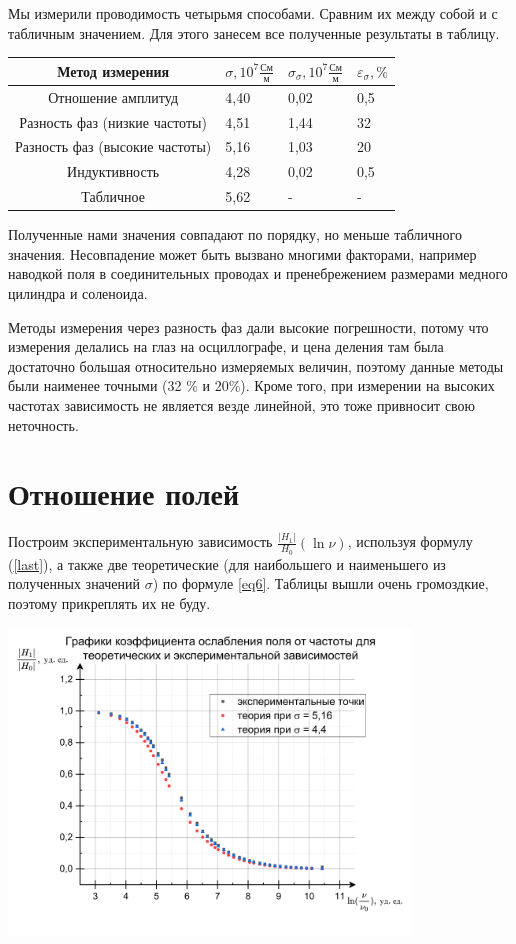 \documentclass[a4paper,12pt]{article}
\theoremstyle{plain} %
\theoremstyle{definition} %
\theoremstyle{remark} %
\renewcommand{\epsilon}{\varepsilon}
\begin{document}
		Мы измерили проводимость четырьмя способами. Сравним их между собой и с табличным значением. Для этого занесем все полученные результаты в таблицу.
													\begin{table}[h]
																\begin{center}
			\begin{tabularx}{0.7\textwidth}{|c|Y|Y|Y|}
				\hline
			Метод измерения & $\sigma,  10^7  \frac{\text{См}}{\text{м}}$ & $\sigma_{\sigma}, 10^7  \frac{\text{См}}{\text{м}}$ & $\epsilon_{\sigma}, \%$ \\ \hline
			Отношение амплитуд& 4,40 & 0,02 & 0,5 \\ \hline
			Разность фаз (низкие частоты)& 4,51 & 1,44 & 32 \\ \hline
			Разность фаз (высокие частоты)& 5,16 & 1,03 & 20 \\ \hline
			Индуктивность&4,28 & 0,02 & 0,5 \\ \hline
			Табличное&5,62 & - & - \\ \hline
			\end{tabularx}
							\end{center}
			\label{tab:my-table6}
		\end{table}	
		
		Полученные нами значения совпадают по порядку, но меньше табличного значения. Несовпадение может быть вызвано многими факторами, например наводкой поля в соединительных проводах и пренебрежением размерами медного цилиндра и соленоида. 
		
		Методы измерения через разность фаз дали высокие погрешности, потому что измерения делались на глаз на осциллографе, и цена деления там была достаточно большая относительно измеряемых величин, поэтому данные методы были наименее точными (32 \% и 20\%). Кроме того, при измерении на высоких частотах зависимость не является везде линейной, это тоже привносит свою неточность.
		
\section{Отношение полей }		
Построим экспериментальную зависимость $\frac{|H_1|}{H_0} (\ln{\nu})$, используя формулу (\ref{last}), а также две теоретические (для наибольшего и наименьшего из полученных значений $\sigma$) по формуле \eqref{eq6}. Таблицы вышли очень громоздкие, поэтому прикреплять их не буду.

						\includegraphics[width = 0.8\textwidth]{h1h0}
						
\end{document}
